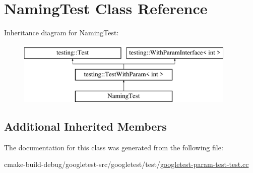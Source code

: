 \hypertarget{classNamingTest}{}\section{Naming\+Test Class Reference}
\label{classNamingTest}
Inheritance diagram for Naming\+Test\+:\begin{figure}[H]
\begin{center}
\leavevmode
\includegraphics[height=3.000000cm]{classNamingTest}
\end{center}
\end{figure}
\subsection*{Additional Inherited Members}


The documentation for this class was generated from the following file\+:\begin{DoxyCompactItemize}
\item 
cmake-\/build-\/debug/googletest-\/src/googletest/test/\mbox{\hyperlink{googletest-param-test-test_8cc}{googletest-\/param-\/test-\/test.\+cc}}\end{DoxyCompactItemize}
